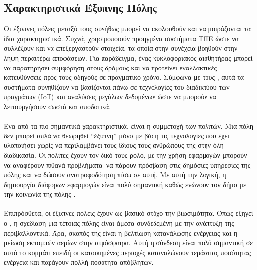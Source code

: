 \subsection{Χαρακτηριστικά Έξυπνης Πόλης}
Οι έξυπνες πόλεις μεταξύ τους συνήθως μπορεί να ακολουθούν και να μοιράζονται τα ίδια χαρακτηριστικά. Συχνά, χρησιμοποιούν προηγμένα συστήματα ΤΠΕ ώστε να συλλέξουν και να επεξεργαστούν στοιχεία, τα οποία στην συνέχεια βοηθούν στην λήψη περαιτέρω αποφάσεων. Για παράδειγμα, ένας κυκλοφοριακός αισθητήρας μπορεί να παρατηρήσει συμφόρηση στους δρόμους και να προτείνει εναλλακτικές κατευθύνσεις προς τους οδηγούς σε πραγματικό χρόνο. Σύμφωνα με τους \textcite{arroub2016literature}, αυτά τα συστήματα συνηθίζουν να βασίζονται πάνω σε τεχνολογίες του διαδικτύου των πραγμάτων (IoT) και αναλύσεις μεγάλων δεδομένων ώστε να μπορούν να λειτουργήσουν σωστά και αποδοτικά.
\\
\\
Ένα από τα πιο σημαντικά χαρακτηριστικά, είναι η συμμετοχή των πολιτών. Μια πόλη δεν μπορεί απλά να θεωρηθεί “έξυπνη” μόνο με βάση τις τεχνολογίες που έχει υλοποιήσει χωρίς να περιλαμβάνει τους ίδιους τους ανθρώπους της στην όλη διαδικασία. Οι πολίτες έχουν τον δικό τους ρόλο, με την χρήση εφαρμογών μπορούν να αναφέρουν πιθανά προβλήματα, να πάρουν πρόσβαση στις δημόσιες υπηρεσίες της πόλης και να δώσουν ανατροφοδότηση πίσω σε αυτή. Με αυτή την λογική, η δημιουργία διάφορων εφαρμογών είναι πολύ σημαντική καθώς ενώνουν τον δήμο με την κοινωνία της πόλης \parencite{arroub2016literature}.
\\
\\
Επιπρόσθετα, οι έξυπνες πόλεις έχουν ως βασικό στόχο την βιωσιμότητα. Όπως εξηγεί ο \textcite{anthopoulos2015defining}, η σχεδίαση μια τέτοιας πόλης είναι άμεσα συνδεδεμένη με την ανάπτυξη της περιβαλλοντικά. Άρα, σκοπός της είναι η βελτίωση κατανάλωσης ενέργειας και η μείωση εκπομπών αερίων στην ατμόσφαιρα. Αυτή η σύνδεση είναι πολύ σημαντική σε αυτό το κομμάτι επειδή οι κατοικημένες περιοχές καταναλώνουν τεράστιας ποσότητας ενέργεια και παράγουν πολλή ποσότητα απόβλητων.

